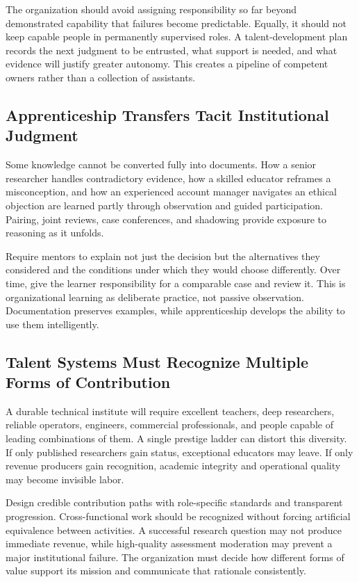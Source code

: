 The organization should avoid assigning responsibility so far beyond demonstrated capability that failures become predictable. Equally, it should not keep capable people in permanently supervised roles. A talent-development plan records the next judgment to be entrusted, what support is needed, and what evidence will justify greater autonomy. This creates a pipeline of competent owners rather than a collection of assistants.

\subsection{Apprenticeship Transfers Tacit Institutional Judgment}
\label{sec:apprenticeship_tacit_judgment}

Some knowledge cannot be converted fully into documents. How a senior researcher handles contradictory evidence, how a skilled educator reframes a misconception, and how an experienced account manager navigates an ethical objection are learned partly through observation and guided participation. Pairing, joint reviews, case conferences, and shadowing provide exposure to reasoning as it unfolds.

Require mentors to explain not just the decision but the alternatives they considered and the conditions under which they would choose differently. Over time, give the learner responsibility for a comparable case and review it. This is organizational learning as deliberate practice, not passive observation. Documentation preserves examples, while apprenticeship develops the ability to use them intelligently.

\subsection{Talent Systems Must Recognize Multiple Forms of Contribution}
\label{sec:talent_systems_multiple_contributions}

A durable technical institute will require excellent teachers, deep researchers, reliable operators, engineers, commercial professionals, and people capable of leading combinations of them. A single prestige ladder can distort this diversity. If only published researchers gain status, exceptional educators may leave. If only revenue producers gain recognition, academic integrity and operational quality may become invisible labor.

Design credible contribution paths with role-specific standards and transparent progression. Cross-functional work should be recognized without forcing artificial equivalence between activities. A successful research question may not produce immediate revenue, while high-quality assessment moderation may prevent a major institutional failure. The organization must decide how different forms of value support its mission and communicate that rationale consistently.

